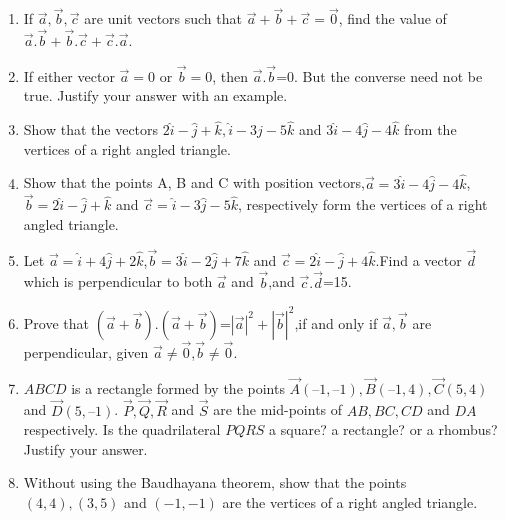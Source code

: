 \begin{enumerate}[label=\thesection.\arabic*,ref=\thesection.\theenumi]
\item If $\overrightarrow {a},\overrightarrow {b},\overrightarrow {c}$ are unit vectors such that $\overrightarrow {a}+\overrightarrow {b}+\overrightarrow {c}=\overrightarrow {0}$, find the value of $\overrightarrow {a}.\overrightarrow {b}+\overrightarrow {b}.\overrightarrow {c}+\overrightarrow {c}.\overrightarrow {a}$.
	\\
	\solution
		
\item If either vector $\overrightarrow {a}=0$ or $\overrightarrow {b}=0$, then $\overrightarrow {a}.\overrightarrow {b}$=0. But the converse need not be true. Justify your answer with an example.
	\\
	\solution
		
\item Show that the vectors $2\hat{i}-\hat{j}+\hat{k},\hat{i}-3\hat{j}-5\hat{k}$ and  $3\hat{i}-4\hat{j}-4\hat{k}$ from the vertices of a right angled triangle.
	\\
	\solution
		
\item Show that the points A, B and C with position vectors,$\vec{a}=3\hat{i}-4\hat{j}-4\hat{k}$,$\vec{b}=2\hat{i}-\hat{j}+\hat{k}$ and $\vec{c}=\hat{i}-3\hat{j}-5\hat{k}$, respectively form the vertices of a right angled
triangle.
\\
\solution
		
\item Let $\vec{a}=\hat{i}+4\hat{j}+2\hat{k}$,$\vec{b}=3\hat{i}-2\hat{j}+7\hat{k}$ and $\vec{c}=2\hat{i}-\hat{j}+4\hat{k}$.Find a vector $\vec{d}$ which is perpendicular to both $\vec{a}$ and $\vec{b}$,and $\vec{c}.\vec{d}$=15.\\
	\solution
		
\item Prove that $(\vec{a}+\vec{b}).(\vec{a}+\vec{b})$=$|{\vec{a}}|^2+|{\vec{b}}|^2$,if and only if $\vec{a},\vec{b}$ are perpendicular, given $\vec{a}\neq\vec{0}$,$\vec{b}\neq\vec{0}$.\\
	\solution
		
\item $ABCD$ is a rectangle formed by the points $\vec{A}(–1, –1), \vec{B}(– 1, 4), \vec{C}(5, 4)$  and  $\vec{D}(5, – 1)$. $\vec{P}, \vec{Q}, \vec{R}$ and $\vec{S}$ are the mid-points of $AB, BC, CD$ and $DA$ respectively. Is the quadrilateral $PQRS$ a square? a rectangle? or a rhombus? Justify your answer.
	\\
	
\item Without using the Baudhayana theorem, show that the points $(4,4),(3,5)$ and $(-1,-1)$ are the vertices of a right angled triangle.

\end{enumerate}

